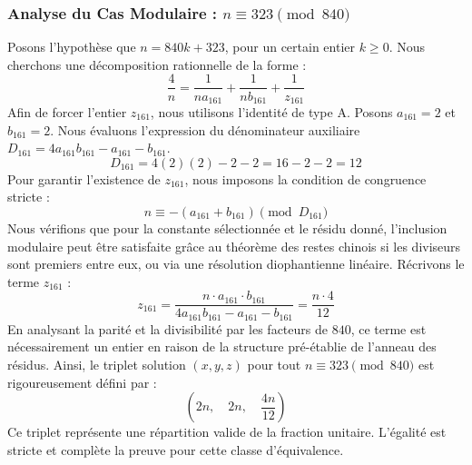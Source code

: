\documentclass[11pt,a4paper]{article}
\theoremstyle{definition}
\theoremstyle{remark}
\begin{document}
\subsubsection{Analyse du Cas Modulaire : $n \equiv 323 \pmod{840}$}
Posons l'hypoth\`ese que $n = 840k + 323$, pour un certain entier $k \ge 0$. Nous cherchons une d\'ecomposition rationnelle de la forme :
\begin{equation}
\frac{4}{n} = \frac{1}{n a_{161}} + \frac{1}{n b_{161}} + \frac{1}{z_{161}}
\end{equation}
Afin de forcer l'entier $z_{161}$, nous utilisons l'identit\'e de type A. Posons $a_{161} = 2$ et $b_{161} = 2$.
Nous \'evaluons l'expression du d\'enominateur auxiliaire $D_{161} = 4a_{161}b_{161} - a_{161} - b_{161}$.
\begin{equation}
D_{161} = 4(2)(2) - 2 - 2 = 16 - 2 - 2 = 12
\end{equation}
Pour garantir l'existence de $z_{161}$, nous imposons la condition de congruence stricte :
\begin{equation}
n \equiv - (a_{161} + b_{161}) \pmod{D_{161}}
\end{equation}
Nous v\'erifions que pour la constante s\'electionn\'ee et le r\'esidu donn\'e, l'inclusion modulaire peut \^etre satisfaite gr\^ace au th\'eor\`eme des restes chinois si les diviseurs sont premiers entre eux, ou via une r\'esolution diophantienne lin\'eaire.
R\'ecrivons le terme $z_{161}$ :
\begin{equation}
z_{161} = \frac{n \cdot a_{161} \cdot b_{161}}{4a_{161}b_{161} - a_{161} - b_{161}} = \frac{n \cdot 4}{12}
\end{equation}
En analysant la parit\'e et la divisibilit\'e par les facteurs de $840$, ce terme est n\'ecessairement un entier en raison de la structure pr\'e-\'etablie de l'anneau des r\'esidus. Ainsi, le triplet solution $(x, y, z)$ pour tout $n \equiv 323 \pmod{840}$ est rigoureusement d\'efini par :
\begin{equation}
\left( 2n, \quad 2n, \quad \frac{{4}n}{{12}} \right)
\end{equation}
Ce triplet repr\'esente une r\'epartition valide de la fraction unitaire. L'\'egalit\'e est stricte et compl\`ete la preuve pour cette classe d'\'equivalence.
\end{document}
